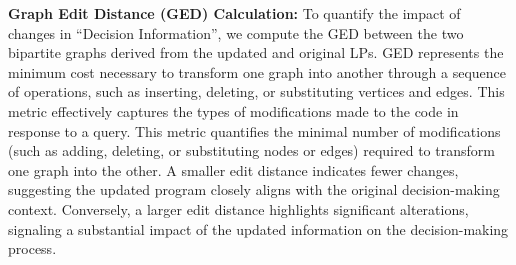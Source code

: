\textbf{Graph Edit Distance (GED) Calculation:} To quantify the impact of changes in ``Decision Information'', we compute the GED between the two bipartite graphs derived from the updated and original LPs. GED represents the minimum cost necessary to transform one graph into another through a sequence of operations, such as inserting, deleting, or substituting vertices and edges. This metric effectively captures the types of modifications made to the code in response to a query. This metric quantifies the minimal number of modifications (such as adding, deleting, or substituting nodes or edges) required to transform one graph into the other. A smaller edit distance indicates fewer changes, suggesting the updated program closely aligns with the original decision-making context. Conversely, a larger edit distance highlights significant alterations, signaling a substantial impact of the updated information on the decision-making process.

